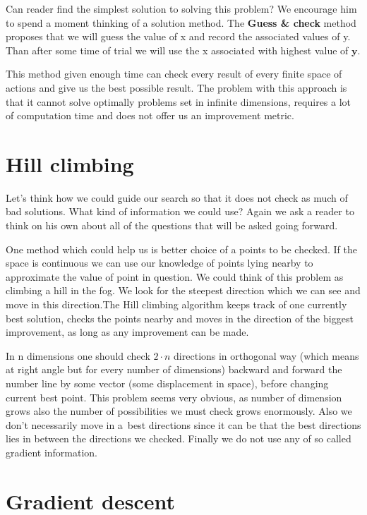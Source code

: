 Can reader find the simplest solution to solving this problem? We encourage him to spend a moment thinking of a solution method. The \textbf{Guess \& check} method proposes that we will guess the value of x and record the associated values of y. Than after some time of trial we will use the x associated with highest value of $\boldsymbol{y}$.

This method given enough time can check every result of every finite space of actions and give us the best possible result. The problem with this approach is that it cannot solve optimally problems set in infinite dimensions, requires a lot of computation time and does not offer us an improvement metric.


\section{Hill climbing}

Let’s think how we could guide our search so that it does not check as much of bad solutions. What kind of information we could use? Again we ask a reader to think on his own about all of the questions that will be asked going forward.

One method which could help us is better choice of a points to be checked. If the space is continuous we can use our knowledge of points lying nearby to approximate the value of point in question. We could think of this problem as climbing a hill in the fog. We look for the steepest direction which we can see and move in this direction.The Hill climbing algorithm keeps track of one currently best solution, checks the points nearby and moves in the direction of the biggest improvement, as long as any improvement can be made.

In n dimensions one should check $2 \cdot n$ directions in orthogonal way (which means at right angle but for every number of dimensions) backward and forward the number line by some vector (some displacement in space), before changing current best point. This problem seems very obvious, as number of dimension grows also the number of possibilities we must check grows enormously. Also we don’t necessarily move in a~best directions since it can be that the best directions lies in between the directions we checked. Finally we do not use any of so called gradient information.


\section{Gradient descent}

